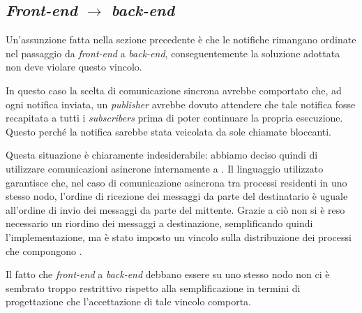 \subsection*{\textit{Front-end} $\rightarrow$ \textit{back-end}}
Un'assunzione fatta nella sezione precedente è che le notifiche rimangano ordinate nel passaggio da \textit{front-end} a \textit{back-end}, conseguentemente la soluzione adottata non deve violare questo vincolo.

In questo caso la scelta di comunicazione sincrona avrebbe comportato che, ad ogni notifica inviata, un \textit{publisher} avrebbe dovuto attendere che tale notifica fosse recapitata a tutti i \textit{subscribers} prima di poter continuare la propria esecuzione. Questo perché la notifica sarebbe stata veicolata da sole chiamate bloccanti.

Questa situazione è chiaramente indesiderabile: abbiamo deciso quindi di utilizzare comunicazioni asincrone internamente a \evdisp{}. Il linguaggio utilizzato garantisce che, nel caso di comunicazione asincrona tra processi residenti in uno stesso nodo, l'ordine di ricezione dei messaggi da parte del destinatario è uguale all'ordine di invio dei messaggi da parte del mittente. Grazie a ciò non si è reso necessario un riordino dei messaggi a destinazione, semplificando quindi l'implementazione, ma è stato imposto un vincolo sulla distribuzione dei processi che compongono \evdisp{}.

Il fatto che \textit{front-end} a \textit{back-end} debbano essere su uno stesso nodo non ci è sembrato troppo restrittivo rispetto alla semplificazione in termini di progettazione che l'accettazione di tale vincolo comporta.
